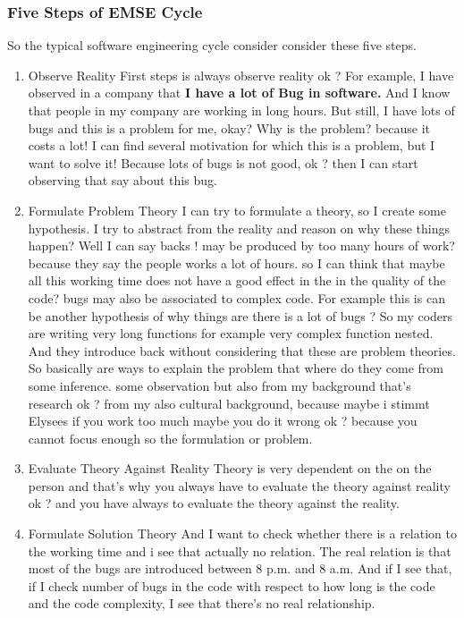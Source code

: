 \documentclass[conference, compsoc, twoside]{IEEEtran}
\begin{document}
\subsubsection{Five Steps of EMSE Cycle} %
\label{sub:five_steps_of_emse_cycle}
So the typical software engineering cycle consider consider these five steps.
\begin{enumerate}
	\item Observe Reality
	First steps is always observe reality ok ? For example, I have observed in a company that \textbf{I have a lot of Bug in software.}
	And I know that people in my company are working in long hours.
	But still, I have lots of bugs and this is a problem for me, okay? 
	Why is the problem? because it costs a lot! I can find several motivation for which this is a problem, but I want to solve it! 
	Because lots of bugs is not good, ok ? then I can start observing that say about this bug.
	\item Formulate Problem Theory
	I can try to formulate a theory, so I create some hypothesis. I try to abstract from the reality and reason on why these things happen? Well I can say backs ! 
	may be produced by too many hours of work? 
	because they say the people works a lot of hours.
	so I can think that maybe all this working time does not have a good effect in the in the quality of the code? 
	bugs may also be associated to complex code. For example this is can be another hypothesis of why things are there is a lot of bugs ?
So my coders are writing very long functions for example very complex function nested.
And they introduce back without considering that these are problem theories. 
So basically are ways to explain the problem that where do they come from some inference. 
some observation but also from my background that's research ok ? 
from my also cultural background, because maybe i stimmt Elysees if you work too much maybe you do it wrong ok ? because you cannot focus enough so the formulation or problem. 	
	\item Evaluate Theory Against Reality
Theory is very dependent on the on the person and that's why you always have to evaluate the theory against reality ok ? and you have always to evaluate the theory against the reality.
	\item Formulate Solution Theory
And I want to check whether there is a relation to the working time and i see that actually no relation.
The real relation is that most of the bugs are introduced between 8 p.m. and 8 a.m. 
And if I see that, if I check number of bugs in the code with respect to how long is the code and the code complexity, I see that there's no real relationship.

\end{enumerate}
\end{document}
